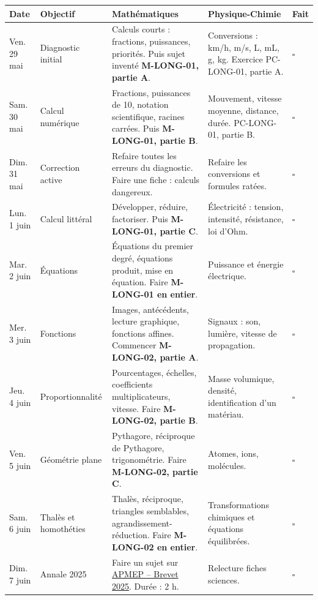 \begin{longtable}{|p{2.3cm}|p{3.2cm}|p{4.7cm}|p{4.7cm}|p{0.7cm}|}
\hline
\textbf{Date} & \textbf{Objectif} & \textbf{Mathématiques} & \textbf{Physique-Chimie} & \textbf{Fait} \\
\hline
Ven. 29 mai & Diagnostic initial & Calculs courts : fractions, puissances, priorités. Puis sujet inventé \textbf{M-LONG-01, partie A}. & Conversions : km/h, m/s, L, mL, g, kg. Exercice PC-LONG-01, partie A. & $\square$ \\
\hline
Sam. 30 mai & Calcul numérique & Fractions, puissances de 10, notation scientifique, racines carrées. Puis \textbf{M-LONG-01, partie B}. & Mouvement, vitesse moyenne, distance, durée. PC-LONG-01, partie B. & $\square$ \\
\hline
Dim. 31 mai & Correction active & Refaire toutes les erreurs du diagnostic. Faire une fiche : calculs dangereux. & Refaire les conversions et formules ratées. & $\square$ \\
\hline
Lun. 1 juin & Calcul littéral & Développer, réduire, factoriser. Puis \textbf{M-LONG-01, partie C}. & Électricité : tension, intensité, résistance, loi d'Ohm. & $\square$ \\
\hline
Mar. 2 juin & Équations & Équations du premier degré, équations produit, mise en équation. Faire \textbf{M-LONG-01 en entier}. & Puissance et énergie électrique. & $\square$ \\
\hline
Mer. 3 juin & Fonctions & Images, antécédents, lecture graphique, fonctions affines. Commencer \textbf{M-LONG-02, partie A}. & Signaux : son, lumière, vitesse de propagation. & $\square$ \\
\hline
Jeu. 4 juin & Proportionnalité & Pourcentages, échelles, coefficients multiplicateurs, vitesse. Faire \textbf{M-LONG-02, partie B}. & Masse volumique, densité, identification d'un matériau. & $\square$ \\
\hline
Ven. 5 juin & Géométrie plane & Pythagore, réciproque de Pythagore, trigonométrie. Faire \textbf{M-LONG-02, partie C}. & Atomes, ions, molécules. & $\square$ \\
\hline
Sam. 6 juin & Thalès et homothéties & Thalès, réciproque, triangles semblables, agrandissement-réduction. Faire \textbf{M-LONG-02 en entier}. & Transformations chimiques et équations équilibrées. & $\square$ \\
\hline
Dim. 7 juin & Annale 2025 & Faire un sujet sur \href{https://www.apmep.fr/Brevet-2025}{APMEP -- Brevet 2025}. Durée : 2 h. & Relecture fiches sciences. & $\square$ \\

\end{longtable}
